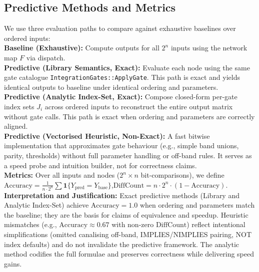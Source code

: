 \documentclass[11pt]{article}
\begin{document}
\subsection{Predictive Methods and Metrics}
We use three evaluation paths to compare against exhaustive baselines over ordered inputs:\\
\textbf{Baseline (Exhaustive):} Compute outputs for all \(2^n\) inputs using the network map \(F\) via dispatch.\\
\textbf{Predictive (Library Semantics, Exact):} Evaluate each node using the same gate catalogue \texttt{Integration\textasciigrave Gates::ApplyGate}. This path is exact and yields identical outputs to baseline under identical ordering and parameters.\\
\textbf{Predictive (Analytic Index-Set, Exact):} Compose closed-form per-gate index sets \(J_i\) across ordered inputs to reconstruct the entire output matrix without gate calls. This path is exact when ordering and parameters are correctly aligned.\\
\textbf{Predictive (Vectorised Heuristic, Non-Exact):} A fast bitwise implementation that approximates gate behaviour (e.g., simple band unions, parity, thresholds) without full parameter handling or off-band rules. It serves as a speed probe and intuition builder, not for correctness claims.\\
\textbf{Metrics:} Over all inputs and nodes (\(2^n\times n\) bit-comparisons), we define\\
\(\mathrm{Accuracy}=\frac{1}{n\cdot 2^n}\sum \mathbf{1}\{Y_{\mathrm{pred}}=Y_{\mathrm{base}}\}\),\quad \(\mathrm{DiffCount}=n\cdot 2^n \cdot (1-\mathrm{Accuracy})\).\\
\textbf{Interpretation and Justification:} Exact predictive methods (Library and Analytic Index-Set) achieve \(\mathrm{Accuracy}=1.0\) when ordering and parameters match the baseline; they are the basis for claims of equivalence and speedup. Heuristic mismatches (e.g., \(\mathrm{Accuracy}\approx 0.67\) with non-zero \(\mathrm{DiffCount}\)) reflect intentional simplifications (omitted canalising off-band, IMPLIES/NIMPLIES pairing, NOT index defaults) and do not invalidate the predictive framework. The analytic method codifies the full formulae and preserves correctness while delivering speed gains.\\
\end{document}
